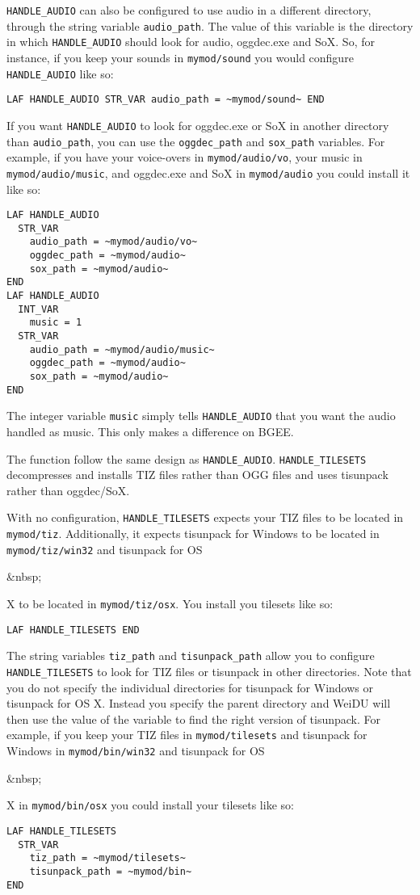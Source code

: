 \documentclass{article}
\def\ttref#1{\ahrefloc{#1}{\tt #1}}
\begin{document}
\verb+HANDLE_AUDIO+ can also be configured to use audio in a different
directory, through the string variable \verb+audio_path+. The value of
this variable is the directory in which \verb+HANDLE_AUDIO+ should
look for audio, oggdec.exe and SoX. So, for instance, if you keep your
sounds in \verb+mymod/sound+ you would configure \verb+HANDLE_AUDIO+
like so:
\begin{verbatim}
LAF HANDLE_AUDIO STR_VAR audio_path = ~mymod/sound~ END
\end{verbatim}
If you want \verb+HANDLE_AUDIO+ to look for oggdec.exe or SoX in
another directory than \verb+audio_path+, you can use the
\verb+oggdec_path+ and \verb+sox_path+ variables.  For example, if you
have your voice-overs in \verb+mymod/audio/vo+, your music in
\verb+mymod/audio/music+, and oggdec.exe and SoX in \verb+mymod/audio+
you could install it like so:
\begin{verbatim}
LAF HANDLE_AUDIO
  STR_VAR
    audio_path = ~mymod/audio/vo~
    oggdec_path = ~mymod/audio~
    sox_path = ~mymod/audio~
END
LAF HANDLE_AUDIO
  INT_VAR
    music = 1
  STR_VAR
    audio_path = ~mymod/audio/music~
    oggdec_path = ~mymod/audio~
    sox_path = ~mymod/audio~
END
\end{verbatim}
The integer variable \verb+music+ simply tells \verb+HANDLE_AUDIO+
that you want the audio handled as music. This only makes a difference
on BGEE.

The function \ttref{HANDLE!TILESETS} follow the same design as
\verb+HANDLE_AUDIO+. \verb+HANDLE_TILESETS+ decompresses and installs
TIZ files rather than OGG files and uses tisunpack rather than
oggdec/SoX.

With no configuration, \verb+HANDLE_TILESETS+ expects your TIZ files
to be located in \verb+mymod/tiz+. Additionally, it expects tisunpack
for Windows to be located in \verb+mymod/tiz/win32+ and tisunpack for
OS\begin{rawhtml}&nbsp;\end{rawhtml}X to be located in
\verb+mymod/tiz/osx+. You install you tilesets like so:
\begin{verbatim}
LAF HANDLE_TILESETS END
\end{verbatim}
The string variables \verb+tiz_path+ and \verb+tisunpack_path+ allow
you to configure \verb+HANDLE_TILESETS+ to look for TIZ files or
tisunpack in other directories. Note that you do not specify the
individual directories for tisunpack for Windows or tisunpack for OS
X. Instead you specify the parent directory and WeiDU will then use
the value of the variable \ttref{WEIDU!OS} to find the right version
of tisunpack. For example, if you keep your TIZ files in
\verb+mymod/tilesets+ and tisunpack for Windows in
\verb+mymod/bin/win32+ and tisunpack for
OS\begin{rawhtml}&nbsp;\end{rawhtml}X in \verb+mymod/bin/osx+ you
could install your tilesets like so:
\begin{verbatim}
LAF HANDLE_TILESETS
  STR_VAR
    tiz_path = ~mymod/tilesets~
    tisunpack_path = ~mymod/bin~
END
\end{verbatim}
\end{document}

